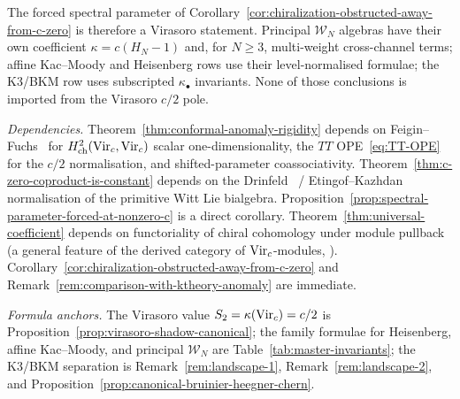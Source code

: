 The forced spectral parameter of
Corollary~\ref{cor:chiralization-obstructed-away-from-c-zero} is therefore a
Virasoro statement. Principal $\mathcal W_N$ algebras have their own
coefficient $\kappa=c(H_N-1)$ and, for $N\geq3$, multi-weight
cross-channel terms; affine Kac--Moody and Heisenberg rows use their
level-normalised formulae; the K3/BKM row uses subscripted
$\kappa_\bullet$ invariants. None of those conclusions is imported
from the Virasoro $c/2$ pole.

\bigskip

\noindent\emph{Dependencies.}
Theorem~\ref{thm:conformal-anomaly-rigidity} depends on
Feigin--Fuchs~\cite{FF84} for $H^{2}_{\mathrm{ch}}(\mathrm{Vir}_{c}, \mathrm{Vir}_{c})$ scalar
one-dimensionality, the $TT$ OPE~\eqref{eq:TT-OPE} for the
$c/2$ normalisation, and shifted-parameter coassociativity.
Theorem~\ref{thm:c-zero-coproduct-is-constant} depends on the
Drinfeld~\cite{Dri87} / Etingof--Kazhdan~\cite{EK96}
normalisation of the primitive Witt Lie bialgebra.
Proposition~\ref{prop:spectral-parameter-forced-at-nonzero-c} is a
direct corollary. Theorem~\ref{thm:universal-coefficient} depends on
functoriality of chiral cohomology under module pullback
(a general feature of the derived category of $\mathrm{Vir}_{c}$-modules,
\cite{FBZ04}). Corollary~\ref{cor:chiralization-obstructed-away-from-c-zero}
and Remark~\ref{rem:comparison-with-ktheory-anomaly} are immediate.

\noindent\emph{Formula anchors.}
The Virasoro value $S_2=\kappa(\mathrm{Vir}_{c})=c/2$ is
Proposition~\ref{prop:virasoro-shadow-canonical}; the family formulae
for Heisenberg, affine Kac--Moody, and principal $\mathcal W_N$ are
Table~\ref{tab:master-invariants}; the K3/BKM separation is
Remark~\ref{rem:landscape-1}, Remark~\ref{rem:landscape-2}, and
Proposition~\ref{prop:canonical-bruinier-heegner-chern}.

